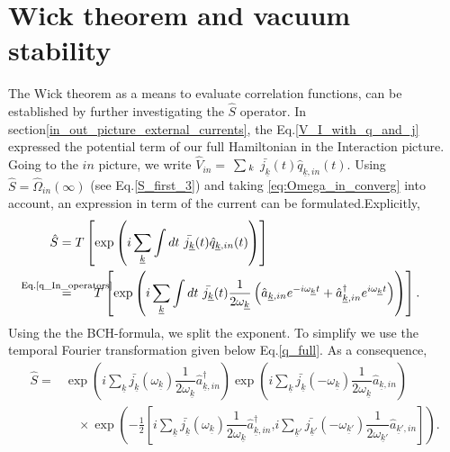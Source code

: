 \documentclass[12pt, titlepage]{article}
\begin{document}
\section{Wick theorem and vacuum stability}\label{Vacuum_transition}
The Wick theorem as a means to evaluate correlation functions, can be established by further investigating the $ \hat{S} $ operator. In section\enskip\ref{in_out_picture_external_currents}, the Eq.\enskip\eqref{V_I_with_q_and_j} expressed the potential term of our full Hamiltonian in the Interaction picture. Going  to the $ in $ picture, we write $\hat{V}_{in}=\! \! $ $ \text{$\sum \!\! \textcolor{white}{i}_{k}$}$ $ \!     \bar{j_{\underline{k}}}(t) \hat{q}_{\underline{k},in}(t) $. Using $ \hat{S}=\hat{\Omega}_{in}(\infty) $ (see Eq.\enskip\eqref{S_first_3}) and taking \eqref{eq:Omega_in_converg}  into account, an expression in term of the current can be formulated.Explicitly,
\begin{subequations}\label{S_start_wick}
\begin{align}
	\hat{S} &=
	T\left[
    \exp
    \left(
    i
    \sum_{\underline{k}}\int dt \ \bar{j_{\underline{k}}}(t) \hat{q}_{\underline{k},in}(t) 
    \right)
    \right]  
   \\
   &\stackrel{\mathclap{\text{Eq.\text{\eqref{q_In_operators}}}}}{=} \hspace*{1.5em} 
   T\left[
   \exp
   \left(
       i
    \sum_{\underline{k}}\int dt \ \bar{j_{\underline{k}}}(t)
     \dfrac{1}{2\omega_{\underline{k}}}\left(
	\hat{a}_{\underline{k},in} 
	e^{-i\omega_{\underline{k}}t}
	+
	\hat{a}^{\dagger}_{\underline{k},in}  
	e^{i\omega_{\underline{k}}t}
  \right)
   \right)
   \right]   
   .
\end{align}
\end{subequations}
Using the the BCH-formula, we split the exponent. To simplify we use the temporal Fourier transformation given below Eq.\enskip\eqref{q_full}. As a consequence,
\begin{equation}
\begin{split}
\hat{S}=
&
 \exp
    \left(
       i
    \sum_{\underline{k}}
    \bar{j_{\underline{k}}}(\omega_{\underline{k}})
     	\dfrac{1}{2\omega_{\underline{k}}}
			\hat{a}^{\dagger}_{\underline{k},in}    
    \right)
    \exp
    \left(
        i
    \sum_{\underline{k}}
    \bar{j_{\underline{k}}}(-\omega_{\underline{k}})
     	\dfrac{1}{2\omega_{\underline{k}}}
			\hat{a}_{\underline{k},in} 
    \right)    
	\\
&\quad
   \times 
   \exp
    \left(
       -\frac{1}{2}
            	\left[
            	     			i
     	    \sum_{\underline{k}}
     	        \bar{j_{\underline{k}}}(\omega_{\underline{k}})
     	\dfrac{1}{2\omega_{\underline{k}}}
			\hat{a}^{\dagger}_{\underline{k},in} 
     	\textbf{,}
            	i
    \sum_{\underline{k}'}
        \bar{j_{\underline{k}'}}(-\omega_{\underline{k}'})
     	\dfrac{1}{2\omega_{\underline{k}'}}
			\hat{a}_{\underline{k}',in} 
		\right]  
		\right)      	
	.
\end{split}
\end{equation}
\end{document}
